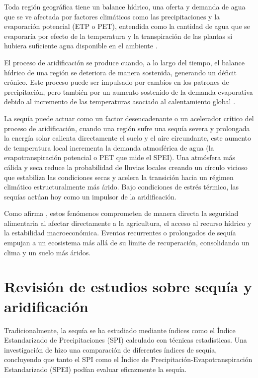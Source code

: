Toda región geográfica tiene un balance hídrico, una oferta y demanda de agua que se ve afectada por factores climáticos como las precipitaciones y la evaporación potencial (ETP o PET), entendida como la cantidad de agua que se evaporaría por efecto de la temperatura y la transpiración de las plantas si hubiera suficiente agua disponible en el ambiente \cite{vicenteserrano2010}. 

El proceso de aridificación se produce cuando, a lo largo del tiempo, el balance hídrico de una región se deteriora de manera sostenida, generando un déficit crónico. Este proceso puede ser impulsado por cambios en los patrones de precipitación, pero también por un aumento sostenido de la demanda evaporativa debido al incremento de las temperaturas asociado al calentamiento global \cite{mishra2010}.

La sequía puede actuar como un factor desencadenante o un acelerador crítico del proceso de aridificación, cuando una región sufre una sequía severa y prolongada la energía solar calienta directamente el suelo y el aire circundante, este aumento de temperatura local incrementa la demanda atmosférica de agua (la evapotranspiración potencial o PET que mide el SPEI). Una atmósfera más cálida y seca reduce la probabilidad de lluvias locales creando un círculo vicioso que estabiliza las condiciones secas y acelera la transición hacia un régimen climático estructuralmente más árido. Bajo condiciones de estrés térmico, las sequías actúan hoy como un impulsor de la aridificación.

Como afirma , estos fenómenos comprometen de manera directa la seguridad alimentaria al afectar directamente a la agricultura, el acceso al recurso hídrico y la estabilidad macroeconómica. Eventos recurrentes o prolongados de sequía empujan a un ecosistema más allá de su límite de recuperación, consolidando un clima y un suelo más áridos.


\section{Revisión de estudios sobre sequía y aridificación}

Tradicionalmente, la sequía se ha estudiado mediante índices como el Índice Estandarizado de Precipitaciones (SPI) calculado con técnicas estadísticas. Una investigación de  hizo una comparación de diferentes índices de sequía, concluyendo que tanto el SPI como el Índice de Precipitación-Evapotranspiración Estandarizado (SPEI) podían evaluar eficazmente la sequía.

